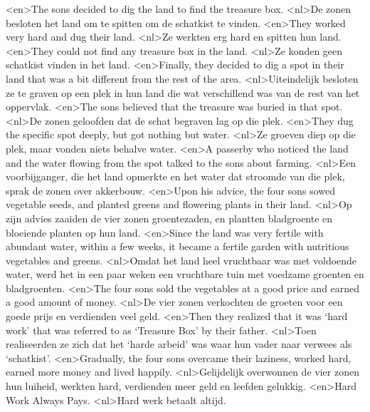 <en>The sons decided to dig the land to find the treasure box.
<nl>De zonen besloten het land om te spitten om de schatkist te vinden.
<en>They worked very hard and dug their land.
<nl>Ze werkten erg hard en spitten hun land.
<en>They could not find any treasure box in the land.
<nl>Ze konden geen schatkist vinden in het land.
<en>Finally, they decided to dig a spot in their land that was a bit different from the rest of the area.
<nl>Uiteindelijk besloten ze te graven op een plek in hun land die wat verschillend was van de rest van het oppervlak. 
<en>The sons believed that the treasure was buried in that spot.
<nl>De zonen geloofden dat de schat begraven lag op die plek.
<en>They dug the specific spot deeply, but got nothing but water.
<nl>Ze groeven diep op die plek, maar vonden niets behalve water.
<en>A passerby who noticed the land and the water flowing from the spot talked to the sons about farming.
<nl>Een voorbijganger, die het land opmerkte en het water dat stroomde van die plek, sprak de zonen over akkerbouw. 
<en>Upon his advice, the four sons sowed vegetable seeds, and planted greens and flowering plants in their land.
<nl>Op zijn advies zaaiden de vier zonen groentezaden, en plantten bladgroente en bloeiende planten op hun land.
<en>Since the land was very fertile with abundant water, within a few weeks, it became a fertile garden with nutritious vegetables and greens.
<nl>Omdat het land heel vruchtbaar was met voldoende water, werd het in een paar weken een vruchtbare tuin met voedzame groenten en bladgroenten.
<en>The four sons sold the vegetables at a good price and earned a good amount of money.
<nl>De vier zonen verkochten de groeten voor een goede prijs en verdienden veel geld.
<en>Then they realized that it was `hard work' that was referred to as ‘Treasure Box’ by their father.
<nl>Toen realiseerden ze zich dat het `harde arbeid' was waar hun vader naar verwees als `schatkist'.
<en>Gradually, the four sons overcame their laziness, worked hard, earned more money and lived happily.
<nl>Gelijdelijk overwonnen de vier zonen hun luiheid, werkten hard, verdienden meer geld en leefden gelukkig.
<en>Hard Work Always Pays.
<nl>Hard werk betaalt altijd.
